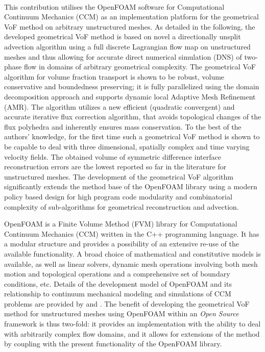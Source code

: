 This contribution utilises the OpenFOAM{\textsuperscript{\textregistered}}
software for Computational Continuum Mechanics (CCM) as an implementation
platform for the geometrical VoF method on arbitrary unstructured meshes. As 
detailed in the following, the developed geometrical VoF method is based on novel 
a directionally unsplit advection algorithm using a full discrete Lagrangian flow 
map on unstructured meshes and thus allowing for accurate direct numerical 
simulation (DNS) of two-phase flow in domains of arbitrary geometrical complexity. 
The geometrical VoF algorithm for volume fraction transport is shown to be robust, 
volume conservative and boundedness preserving; it is fully parallelized using 
the domain decomposition approach and supports dynamic local Adaptive Mesh 
Refinement (AMR). The algorithm utilizes a new efficient (quadratic convergent) and 
accurate iterative flux correction algorithm, that avoids topological changes of 
the flux polyhedra and inherently ensures mass conservation. To the best of the 
authors' knowledge, for the first time such a geometrical VoF method is shown to 
be capable to deal with three dimensional, spatially complex and time varying 
velocity fields. The obtained volume of symmetric difference interface 
reconstruction errors are the lowest reported so far in the literature for 
unstructured meshes. %
The development of the geometrical VoF algorithm significantly extends the method 
base of the OpenFOAM library using a modern policy based design for high program 
code modularity and combinatorial complexity of sub-algorithms for geometrical 
reconstruction and advection. %

OpenFOAM is a Finite Volume Method (FVM) library for Computational Continuum 
Mechanics (CCM) written in the C++ programming language. It has a modular structure 
and provides a possibility of an extensive re-use of the available functionality. 
A broad choice of mathematical and constitutive models is available, as well as 
linear solvers, dynamic mesh operations involving both mesh motion and topological
operations and a comprehensive set of boundary conditions, etc. Details of the 
development model of OpenFOAM and its relationship to continuum mechanical modeling 
and simulations of CCM problems are provided by \citet{WellerJasak1998} and
\citet{Jasak2007}. The benefit of developing the geometrical VoF method for 
unstructured  meshes using OpenFOAM within an \emph{Open Source} framework is thus 
two-fold: it provides an implementation with the ability to deal with arbitrarily 
complex flow domains, and it allows for extensions of the method by coupling with 
the present functionality of the OpenFOAM library. 

